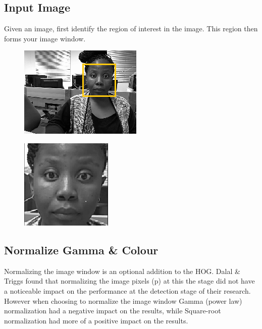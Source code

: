 \subsection{Input Image}
Given an image, first identify the region of interest in the image. This region then forms your image window.
\begin{figure}[H]
\centering
\begin{minipage}{.5\textwidth}
  \centering
  \includegraphics[width=.55\linewidth]{image}
  \label{fig:test1}
\end{minipage}%
\begin{minipage}{.5\textwidth}
  \centering
  \includegraphics[width=.5\linewidth]{roi}
  \label{fig:test2}
\end{minipage}
\end{figure}
\subsection{Normalize Gamma \& Colour}
Normalizing the image window is an optional addition to the HOG. Dalal \& Triggs found that normalizing the image pixels (p) at this the stage did not have a noticeable impact on the performance at the detection stage of their research.
However when choosing to normalize the image window Gamma (power law) normalization had a negative impact on the results, while Square-root normalization had more of a positive impact on the results.

